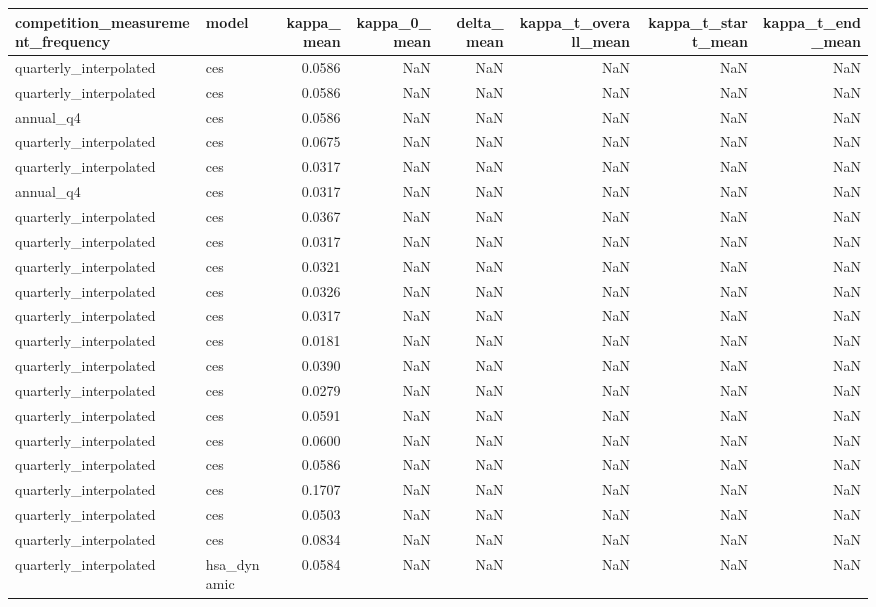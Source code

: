 \begin{tabular}{llrrrrrr}
\toprule
competition\_measurement\_frequency & model & kappa\_mean & kappa\_0\_mean & delta\_mean & kappa\_t\_overall\_mean & kappa\_t\_start\_mean & kappa\_t\_end\_mean \\
\midrule
quarterly\_interpolated & ces & 0.0586 & NaN & NaN & NaN & NaN & NaN \\
quarterly\_interpolated & ces & 0.0586 & NaN & NaN & NaN & NaN & NaN \\
annual\_q4 & ces & 0.0586 & NaN & NaN & NaN & NaN & NaN \\
quarterly\_interpolated & ces & 0.0675 & NaN & NaN & NaN & NaN & NaN \\
quarterly\_interpolated & ces & 0.0317 & NaN & NaN & NaN & NaN & NaN \\
annual\_q4 & ces & 0.0317 & NaN & NaN & NaN & NaN & NaN \\
quarterly\_interpolated & ces & 0.0367 & NaN & NaN & NaN & NaN & NaN \\
quarterly\_interpolated & ces & 0.0317 & NaN & NaN & NaN & NaN & NaN \\
quarterly\_interpolated & ces & 0.0321 & NaN & NaN & NaN & NaN & NaN \\
quarterly\_interpolated & ces & 0.0326 & NaN & NaN & NaN & NaN & NaN \\
quarterly\_interpolated & ces & 0.0317 & NaN & NaN & NaN & NaN & NaN \\
quarterly\_interpolated & ces & 0.0181 & NaN & NaN & NaN & NaN & NaN \\
quarterly\_interpolated & ces & 0.0390 & NaN & NaN & NaN & NaN & NaN \\
quarterly\_interpolated & ces & 0.0279 & NaN & NaN & NaN & NaN & NaN \\
quarterly\_interpolated & ces & 0.0591 & NaN & NaN & NaN & NaN & NaN \\
quarterly\_interpolated & ces & 0.0600 & NaN & NaN & NaN & NaN & NaN \\
quarterly\_interpolated & ces & 0.0586 & NaN & NaN & NaN & NaN & NaN \\
quarterly\_interpolated & ces & 0.1707 & NaN & NaN & NaN & NaN & NaN \\
quarterly\_interpolated & ces & 0.0503 & NaN & NaN & NaN & NaN & NaN \\
quarterly\_interpolated & ces & 0.0834 & NaN & NaN & NaN & NaN & NaN \\
quarterly\_interpolated & hsa\_dynamic & 0.0584 & NaN & NaN & NaN & NaN & NaN \\

\end{tabular}
